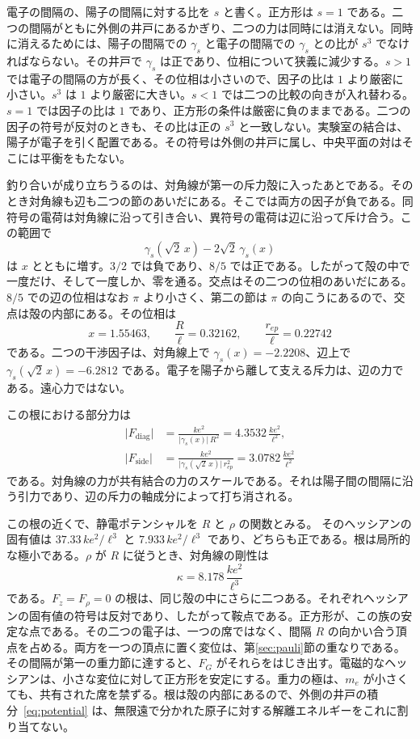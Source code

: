 \documentclass[a4paper]{article}
\begin{document}
電子の間隔の、陽子の間隔に対する比を \(s\) と書く。正方形は \(s=1\) である。二つの間隔がともに外側の井戸にあるかぎり、二つの力は同時には消えない。同時に消えるためには、陽子の間隔での \(\gamma_s\) と電子の間隔での \(\gamma_s\) との比が \(s^{3}\) でなければならない。その井戸で \(\gamma_s\) は正であり、位相について狭義に減少する。\(s>1\) では電子の間隔の方が長く、その位相は小さいので、因子の比は \(1\) より厳密に小さい。\(s^{3}\) は \(1\) より厳密に大きい。\(s<1\) では二つの比較の向きが入れ替わる。\(s=1\) では因子の比は \(1\) であり、正方形の条件は厳密に負のままである。二つの因子の符号が反対のときも、その比は正の \(s^{3}\) と一致しない。実験室の結合は、陽子が電子を引く配置である。その符号は外側の井戸に属し、中央平面の対はそこには平衡をもたない。

釣り合いが成り立ちうるのは、対角線が第一の斥力殻に入ったあとである。そのとき対角線も辺も二つの節のあいだにある。そこでは両方の因子が負である。同符号の電荷は対角線に沿って引き合い、異符号の電荷は辺に沿って斥け合う。この範囲で
\[
\gamma_s(\sqrt{2}\,x)-2\sqrt{2}\,\gamma_s(x)
\]
は \(x\) とともに増す。\(3/2\) では負であり、\(8/5\) では正である。したがって殻の中で一度だけ、そして一度しか、零を通る。交点はその二つの位相のあいだにある。\(8/5\) での辺の位相はなお \(\pi\) より小さく、第二の節は \(\pi\) の向こうにあるので、交点は殻の内部にある。その位相は
\[
x=1.55463,
\qquad
\frac{R}{\ell}=0.32162,
\qquad
\frac{r_{ep}}{\ell}=0.22742
\]
である。二つの干渉因子は、対角線上で \(\gamma_s(x)=-2.2208\)、辺上で \(\gamma_s(\sqrt{2}\,x)=-6.2812\) である。電子を陽子から離して支える斥力は、辺の力である。遠心力ではない。

この根における部分力は
\begin{align}
\bigl|F_{\mathrm{diag}}\bigr|
  &=\frac{k e^{2}}{\bigl|\gamma_s(x)\bigr|\,R^{2}}
  =4.3532\,\frac{k e^{2}}{\ell^{2}},
\label{eq:Fdiag}\\
\bigl|F_{\mathrm{side}}\bigr|
  &=\frac{k e^{2}}{\bigl|\gamma_s(\sqrt{2}\,x)\bigr|\,r_{ep}^{2}}
  =3.0782\,\frac{k e^{2}}{\ell^{2}}
\label{eq:Fside}
\end{align}
である。対角線の力が共有結合の力のスケールである。それは陽子間の間隔に沿う引力であり、辺の斥力の軸成分によって打ち消される。

この根の近くで、静電ポテンシャルを \(R\) と \(\rho\) の関数とみる。
そのヘッシアンの固有値は \(37.33\,k e^{2}/\ell^{3}\) と \(7.933\,k e^{2}/\ell^{3}\) であり、どちらも正である。根は局所的な極小である。\(\rho\) が \(R\) に従うとき、対角線の剛性は
\begin{equation}
\label{eq:kappa}
\kappa=8.178\,\frac{k e^{2}}{\ell^{3}}
\end{equation}
である。\(F_z=F_{\rho}=0\) の根は、同じ殻の中にさらに二つある。それぞれヘッシアンの固有値の符号は反対であり、したがって鞍点である。正方形が、この族の安定な点である。その二つの電子は、一つの席ではなく、間隔 \(R\) の向かい合う頂点を占める。両方を一つの頂点に置く変位は、第\ref{sec:pauli}節の重なりである。その間隔が第一の重力節に達すると、\(F_G\) がそれらをはじき出す。電磁的なヘッシアンは、小さな変位に対して正方形を安定にする。重力の極は、\(m_e\) が小さくても、共有された席を禁ずる。根は殻の内部にあるので、外側の井戸の積分~\eqref{eq:potential} は、無限遠で分かれた原子に対する解離エネルギーをこれに割り当てない。
\end{document}
